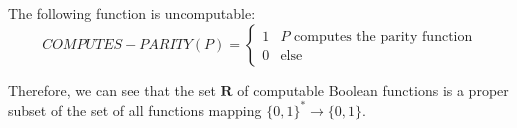   \begin{corollary}
    \label{thm:computes-parity-is-uncomputable}
  The following function is uncomputable: 
  \begin{equation}
    COMPUTES-PARITY(P) = \begin{cases}1 & P \text{ computes the parity function} \\
      0 & \text{else}
      \end{cases}
  \end{equation}
  \end{corollary}

  Therefore, we can see that the set $\mathbf{R}$ of computable Boolean functions is a proper subset of the set of all functions mapping $\{0, 1\}^* \to \{0, 1\}$. 

